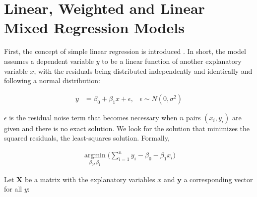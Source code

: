 \documentclass[11pt,a4paper,twoside]{book}\usepackage[]{graphicx}\usepackage[]{color}
\begin{document}

\section{Linear, Weighted and Linear Mixed Regression Models} \label{sec:regression}
First, the concept of simple linear regression is introduced \citep{fahrmeir2007}. In short, the model assumes a dependent variable $y$ to be a linear function of another explanatory variable $x$, with the residuals being distributed independently and identically and following a normal distribution:

\begin{align}
y &= \beta_0 + \beta_1 x + \epsilon, & \epsilon \sim N(0, \sigma^2) \label{eq:simple.regression}
\end{align}

$\epsilon$ is the residual noise term that becomes necessary when $n$ pairs $(x_i, y_i)$ are given and there is no exact solution. We look for the solution that minimizes the squared residuals, the least-squares solution. Formally,

\begin{align}
\operatorname*{argmin}_{\beta_0, \beta_1}\Big(\sum_{i = 1}^n y_i - \beta_0 - \beta_1 x_i\Big) \label{eq:least.squares}
\end{align}

Let $\mathbf{X}$ be a matrix with the explanatory variables $x$ and $\mathbf{y}$ a corresponding vector for all $y$:
\end{document}
